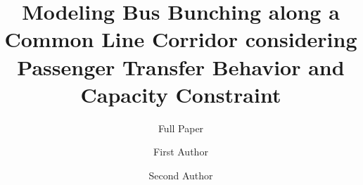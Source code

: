 \documentclass[smallextended]{svjour3}       %
\begin{document}
\title{Modeling Bus Bunching along a Common Line Corridor considering Passenger Transfer Behavior and Capacity Constraint}
\subtitle{Full Paper}


\author{First Author         \and
        Second Author %
}





\maketitle
\end{document}
